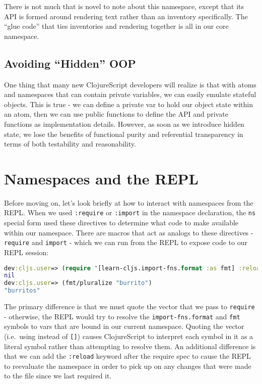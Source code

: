 \documentclass[10pt,twoside,openright]{memoir}
\begin{document}
There is not much that is novel to note about this namespace, except
that its API is formed around rendering text rather than an inventory
specifically. The ``glue code'' that ties inventories and rendering
together is all in our core namespace.


\subsection{Avoiding ``Hidden'' OOP}

One thing that many new ClojureScript developers will realize is that
with atoms and namespaces that can contain private variables, we can
easily emulate stateful objects. This is true - we can define a private
var to hold our object state within an atom, then we can use public
functions to define the API and private functions as implementation
details. However, as soon as we introduce hidden state, we lose the
benefits of functional purity and referential transparency in terms of
both testability and reasonability.


\section{Namespaces and the REPL}

Before moving on, let's look briefly at how to interact with namespaces
from the REPL. When we used \texttt{:require} or \texttt{:import} in the
namespace declaration, the \texttt{ns} special form used these
directives to determine what code to make available within our
namespace. There are macros that act as analogs to these directives -
\texttt{require} and \texttt{import} - which we can run from the REPL to
expose code to our REPL session:

\begin{lstlisting}[language=Clojure]
dev:cljs.user=> (require '[learn-cljs.import-fns.format :as fmt] :reload)
nil
dev:cljs.user=> (fmt/pluralize "burrito")
"burritos"
\end{lstlisting}

The primary difference is that we must quote the vector that we pass to
\texttt{require} - otherwise, the REPL would try to resolve the
\texttt{import-fns.format} and \texttt{fmt} symbols to vars that are
bound in our current namespace. Quoting the vector (i.e.~using
\texttt{\textquotesingle{}{[}{]}} instead of \texttt{{[}{]}}) causes
ClojureScript to interpret each symbol in it as a literal symbol rather
than attempting to resolve them. An additional difference is that we can
add the \texttt{:reload} keyword after the require spec to cause the
REPL to reevaluate the namespace in order to pick up on any changes that
were made to the file since we last required it.
\end{document}
